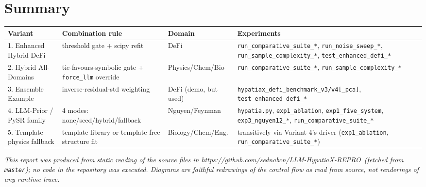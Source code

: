 \documentclass[11pt,a4paper]{article}
\newcommand{\repolink}{\url{https://github.com/sednabcn/LLM-HypatiaX-REPRO}}
\newcommand{\code}[1]{\texttt{\small #1}}
\begin{document}
\section{Summary}
\begin{center}
\renewcommand{\arraystretch}{1.25}
\begin{tabular}{@{}p{2.9cm}p{4.6cm}p{4.0cm}p{3.1cm}@{}}
\toprule
\textbf{Variant} & \textbf{Combination rule} & \textbf{Domain} & \textbf{Experiments} \\
\midrule
1. Enhanced Hybrid DeFi & threshold gate + scipy refit & DeFi & \code{run\_comparative\_suite\_*}, \code{run\_noise\_sweep\_*}, \code{run\_sample\_complexity\_*}, \code{test\_enhanced\_defi\_*} \\
2. Hybrid All-Domains & tie-favours-symbolic gate + \code{force\_llm} override & Physics/Chem/Bio & \code{run\_comparative\_suite\_*}, \code{run\_sample\_complexity\_*} \\
3. Ensemble Example & inverse-residual-std weighting & DeFi (demo, but used) & \code{hypatiax\_defi\_benchmark\_v3/v4[\_pca]}, \code{test\_enhanced\_defi\_*} \\
4. LLM-Prior / PySR family & 4 modes: none/seed/hybrid/fallback & Nguyen/Feynman & \code{hypatia.py}, \code{exp1\_ablation}, \code{exp1\_five\_system}, \code{exp3\_nguyen12\_*}, \code{run\_comparative\_suite\_*} \\
5. Template physics fallback & template-library or template-free structure fit & Biology/Chem/Eng. & transitively via Variant 4's driver (\code{exp1\_ablation}, \code{run\_comparative\_suite\_*}) \\
\bottomrule
\end{tabular}
\end{center}

\vspace{0.4cm}
\noindent\textit{This report was produced from static reading of the source
files in \repolink\ (fetched from \code{master}); no code in the repository
was executed. Diagrams are faithful redrawings of the control flow as read
from source, not renderings of any runtime trace.}
\end{document}
